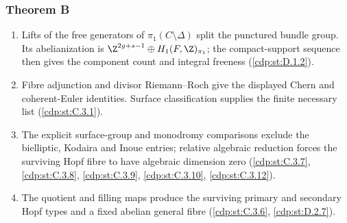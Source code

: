 \subsubsection*{Theorem B}
\begin{enumerate}[label=\arabic*.,leftmargin=*]
\item\hypertarget{step-II-B-1}{} Lifts of the free generators of
$\pi_1(C\setminus\Delta)$ split the punctured bundle group.
Its abelianization is $\Z^{2g+s-1}\oplus H_1(F,\Z)_{\pi_1}$;
the compact-support sequence then gives the component count and
integral freeness (\hyperref[cdp:st:D.1.2]{\ref*{cdp:st:D.1.2}}).
\item\hypertarget{step-II-B-2}{} Fibre adjunction and divisor
Riemann--Roch give the displayed Chern and coherent-Euler
identities. Surface classification supplies the finite necessary
list (\hyperref[cdp:st:C.3.1]{\ref*{cdp:st:C.3.1}}).
\item\hypertarget{step-II-B-3}{} The explicit surface-group and
monodromy comparisons exclude the bielliptic, Kodaira and Inoue
entries; relative algebraic reduction forces the surviving Hopf
fibre to have algebraic dimension zero
(\hyperref[cdp:st:C.3.7]{\ref*{cdp:st:C.3.7}},
\hyperref[cdp:st:C.3.8]{\ref*{cdp:st:C.3.8}},
\hyperref[cdp:st:C.3.9]{\ref*{cdp:st:C.3.9}},
\hyperref[cdp:st:C.3.10]{\ref*{cdp:st:C.3.10}},
\hyperref[cdp:st:C.3.12]{\ref*{cdp:st:C.3.12}}).
\item\hypertarget{step-II-B-4}{} The quotient and filling maps
produce the surviving primary and secondary Hopf types and a fixed
abelian general fibre (\hyperref[cdp:st:C.3.6]{\ref*{cdp:st:C.3.6}},
\hyperref[cdp:st:D.2.7]{\ref*{cdp:st:D.2.7}}).
\end{enumerate}

\hypertarget{outline-II-C}{}
